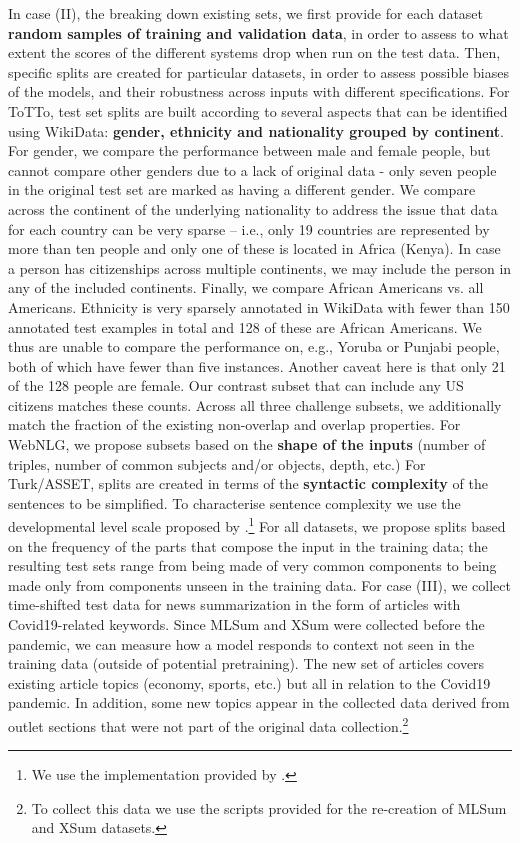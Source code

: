 \documentclass[11pt,a4paper]{article}
\begin{document}
In case (II), the breaking down existing sets, we first provide for each dataset \textbf{random samples of training and validation data}, in order to assess to what extent the scores of the different systems drop when run on the test data. Then, specific splits are created for particular datasets, in order to assess possible biases of the models, and their robustness across inputs with different specifications. For ToTTo, test set splits are built according to several aspects that can be identified using WikiData: \textbf{gender, ethnicity and nationality grouped by continent}. For gender, we compare the performance between male and female people, but cannot compare other genders due to a lack of original data - only seven people in the original test set are marked as having a different gender. We compare across the continent of the underlying nationality to address the issue that data for each country can be very sparse -- i.e., only 19 countries are represented by more than ten people and only one of these is located in Africa (Kenya). In case a person has citizenships across multiple continents, we may include the person in any of the included continents. Finally, we compare African Americans vs. all Americans. Ethnicity is very sparsely annotated in WikiData with fewer than 150 annotated test examples  in total and 128 of these are African Americans. We thus are unable to compare the performance on, e.g., Yoruba or Punjabi people, both of which have fewer than five instances. Another caveat here is that only 21 of the 128 people are female. Our contrast subset that can include any US citizens matches these counts. Across all three challenge subsets, we additionally match the fraction of the existing non-overlap and overlap properties. 
For WebNLG, we propose subsets based on the \textbf{shape of the inputs} (number of triples, number of common subjects and/or objects, depth, etc.) For Turk/ASSET, splits are created in terms of the \textbf{syntactic complexity} of the sentences to be simplified. To characterise sentence complexity we use the developmental level scale proposed by \citet{covington2006complex}.\footnote{We use the implementation provided by \citet{lu2010automatic}.} 
For all datasets, we propose splits based on the frequency of the parts that compose the input in the training data; the resulting test sets range from being made of very common components to being made only from components unseen in the training data.
For case (III), we collect time-shifted test data for news summarization in the form of articles with Covid19-related keywords. Since MLSum and XSum were collected before the pandemic, we can measure how a model responds to context not seen in the training data (outside of potential pretraining). The new set of articles covers existing article topics (economy, sports, etc.) but all in relation to the Covid19 pandemic. In addition, some new topics appear in the collected data derived from outlet sections that were not part of the original data collection.\footnote{To collect this data we use the scripts provided for the re-creation of MLSum and XSum datasets.}
\end{document}
